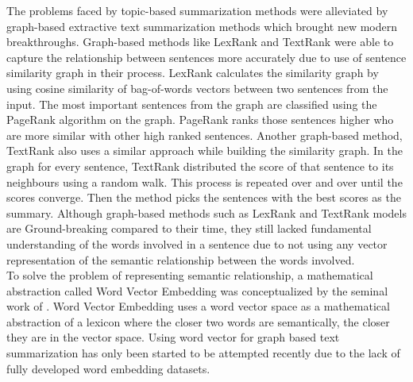 \documentclass[acmlarge]{acmart}
\begin{document}
The problems faced by topic-based summarization methods were alleviated by graph-based extractive text summarization methods which brought new modern breakthroughs. Graph-based methods like LexRank \cite{Erkan-lexRank-2004} and TextRank \cite{mihalcea-2004-textrank} were able to capture the relationship between sentences more accurately due to use of sentence similarity graph in their process. LexRank \cite{Erkan-lexRank-2004} calculates the similarity graph by using cosine similarity of bag-of-words vectors between two sentences from the input. The most important sentences from the graph are classified using the PageRank \cite{page-PageRank-1999} algorithm on the graph. PageRank ranks those sentences higher who are more similar with other high ranked sentences. Another graph-based method, TextRank \cite{mihalcea-2004-textrank} also uses a similar approach while building the similarity graph. In the graph for every sentence, TextRank distributed the score of that sentence to its neighbours using a random walk. This process is repeated over and over until the scores converge. Then the method picks the sentences with the best scores as the summary. Although graph-based methods such as LexRank and TextRank models are Ground-breaking compared to their time, they still lacked fundamental understanding of the words involved in a sentence due to not using any vector representation of the semantic relationship between the words involved.\\

To solve the problem of representing semantic relationship, a mathematical abstraction called Word Vector Embedding was conceptualized by the seminal work of \citeauthor{salton-1975-word-vector} \cite{salton-1975-word-vector}. Word Vector Embedding uses a word vector space as a mathematical abstraction of a lexicon where the closer two words are semantically, the closer they are in the vector space. Using word vector for graph based text summarization has only been started to be attempted recently \cite{Jain-2017-word-vector-embedding-summary} due to the lack of fully developed word embedding datasets.\\
\end{document}
